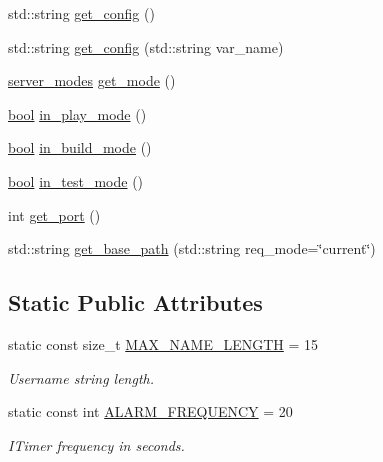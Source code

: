 \begin{DoxyCompactItemize}
\item 
std\-::string \hyperlink{classrpie_1_1server_a0a76549ab2136a685e9b84ae8bc6bf5a}{get\-\_\-config} ()
\item 
std\-::string \hyperlink{classrpie_1_1server_a3db1b71f9fd132bccc92c71451a29f61}{get\-\_\-config} (std\-::string var\-\_\-name)
\item 
\hyperlink{namespacerpie_a54d73f12f21f2462f5c243b3de21d943}{server\-\_\-modes} \hyperlink{classrpie_1_1server_a122efa348d71c17be7def0a2569b5857}{get\-\_\-mode} ()
\item 
\hyperlink{structs_8h_ad5c9d4ba3dc37783a528b0925dc981a0}{bool} \hyperlink{classrpie_1_1server_a1a59fdd2b750ce6f44849457555bf545}{in\-\_\-play\-\_\-mode} ()
\item 
\hyperlink{structs_8h_ad5c9d4ba3dc37783a528b0925dc981a0}{bool} \hyperlink{classrpie_1_1server_a1197ec8dd887726c6a5ae0158aecd69d}{in\-\_\-build\-\_\-mode} ()
\item 
\hyperlink{structs_8h_ad5c9d4ba3dc37783a528b0925dc981a0}{bool} \hyperlink{classrpie_1_1server_a279755eaeae1526dcfb7c3382f154e60}{in\-\_\-test\-\_\-mode} ()
\item 
int \hyperlink{classrpie_1_1server_ab88c2d9b84f0288f3d0ebbd44f4f3983}{get\-\_\-port} ()
\item 
std\-::string \hyperlink{classrpie_1_1server_a48096cd3ff72978503226eaddd8f8780}{get\-\_\-base\-\_\-path} (std\-::string req\-\_\-mode=\char`\"{}current\char`\"{})
\end{DoxyCompactItemize}
\subsection*{Static Public Attributes}
\begin{DoxyCompactItemize}
\item 
static const size\-\_\-t \hyperlink{classrpie_1_1server_a1173d2e4cbb1f0d6c91f04766bdc0802}{M\-A\-X\-\_\-\-N\-A\-M\-E\-\_\-\-L\-E\-N\-G\-T\-H} = 15
\begin{DoxyCompactList}\small\item\em Username string length. \end{DoxyCompactList}\item 
static const int \hyperlink{classrpie_1_1server_a3dec19e76bb1aeb96cbd4b6286cd9286}{A\-L\-A\-R\-M\-\_\-\-F\-R\-E\-Q\-U\-E\-N\-C\-Y} = 20
\begin{DoxyCompactList}\small\item\em I\-Timer frequency in seconds. \end{DoxyCompactList}\end{DoxyCompactItemize}


